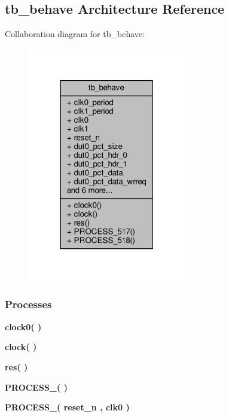 \subsection{tb\+\_\+behave Architecture Reference}
\label{classp2d__rd__fsm__tb_1_1tb__behave}


Collaboration diagram for tb\+\_\+behave\+:\nopagebreak
\begin{figure}[H]
\begin{center}
\leavevmode
\includegraphics[width=196pt]{df/d2c/classp2d__rd__fsm__tb_1_1tb__behave__coll__graph}
\end{center}
\end{figure}
\subsubsection*{Processes}
 \begin{DoxyCompactItemize}
\item 
{\bf clock0}{\bfseries  (  )}
\item 
{\bf clock}{\bfseries  (  )}
\item 
{\bf res}{\bfseries  (  )}
\item 
{\bf P\+R\+O\+C\+E\+S\+S\+\_}{\bfseries  (  )}
\item 
{\bf P\+R\+O\+C\+E\+S\+S\+\_}{\bfseries  ( {\bfseries {\bfseries {\bf reset\+\_\+n}} \textcolor{vhdlchar}{ }} , {\bfseries {\bfseries {\bf clk0}} \textcolor{vhdlchar}{ }} )}
\end{DoxyCompactItemize}
